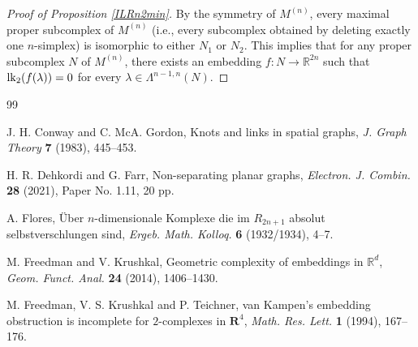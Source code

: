 \documentclass{amsart}
\theoremstyle{definition}
\theoremstyle{remark}
\numberwithin{equation}{section}
\begin{document}
\begin{proof}[Proof of Proposition \ref{ILRn2min}]
By the symmetry of $M^{(n)}$, every maximal proper subcomplex of $M^{(n)}$ (i.e., every subcomplex obtained by deleting exactly one $n$-simplex) is isomorphic to either $N_1$ or $N_2$. This implies that for any proper subcomplex $N$ of $M^{(n)}$, there exists an embedding $f \colon N \to \mathbb{R}^{2n}$ such that ${\rm lk}_2(f(\lambda)) = 0$ for every $\lambda \in \Lambda^{n-1,n}(N)$.
\end{proof}









% 
{\normalsize
%
\begin{thebibliography}{99}




J. H. Conway and C. McA. Gordon, 
Knots and links in spatial graphs, 
\textit{J. Graph Theory} {\bf 7} (1983), 445--453.

H. R. Dehkordi and G. Farr, 
Non-separating planar graphs, 
\textit{Electron. J. Combin.} \textbf{28} (2021), Paper No. 1.11, 20 pp. 





A. Flores, 
\"{U}ber $n$-dimensionale Komplexe die im $R_{2n+1}$ absolut selbstverschlungen sind, \textit{Ergeb. Math. Kolloq.} {\bf 6} (1932/1934), 4--7.




M. Freedman and V. Krushkal, 
Geometric complexity of embeddings in $\mathbb{R}^d$, 
\textit{Geom. Funct. Anal.} \textbf{24} (2014), 1406--1430. 


M. Freedman, V. S. Krushkal and P. Teichner, 
van Kampen's embedding obstruction is incomplete for $2$-complexes in $\textbf{R}^4$, 
\textit{Math. Res. Lett.} \textbf{1} (1994), 167--176. 



\end{thebibliography}}
\end{document}
